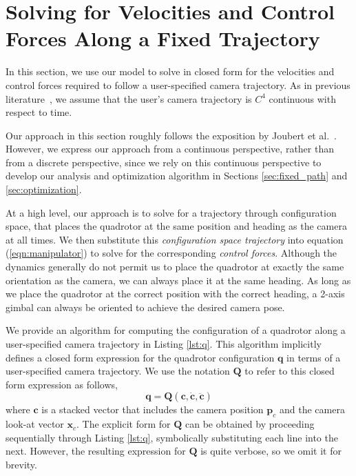 \section{Solving for Velocities and Control Forces Along a Fixed Trajectory}
\label{sec:fixed_trajectory}

In this section, we use our model to solve in closed form for the velocities and control forces required to follow a user-specified camera trajectory.
As in previous literature~\cite{joubert:2015}, we assume that the user's camera trajectory is $C^4$ continuous with respect to time.

Our approach in this section roughly follows the exposition by Joubert et al.~.
However, we express our approach from a continuous perspective, rather than from a discrete perspective, since we rely on this continuous perspective to develop our analysis and optimization algorithm in Sections \ref{sec:fixed_path} and \ref{sec:optimization}.

At a high level, our approach is to solve for a trajectory through configuration space, that places the quadrotor at the same position and heading as the camera at all times.
We then substitute this \emph{configuration space trajectory} into equation (\ref{eqn:manipulator}) to solve for the corresponding \emph{control forces}.
Although the dynamics generally do not permit us to place the quadrotor at exactly the same orientation as the camera, we can always place it at the same heading.
As long as we place the quadrotor at the correct position with the correct heading, a 2-axis gimbal can always be oriented to achieve the desired camera pose.

We provide an algorithm for computing the configuration of a quadrotor along a user-specified camera trajectory in Listing \ref{lst:q}.
This algorithm implicitly defines a closed form expression  for the quadrotor configuration $\mathbf{q}$ in terms of a user-specified camera trajectory.
We use the notation $\mathbf{Q}$ to refer to this closed form expression as follows,
%
\begin{equation}
\mathbf{q} = \mathbf{Q} (\mathbf{c},\dot{\mathbf{c}},\ddot{\mathbf{c}})
\label{eqn:q}
\end{equation}
%
where $\mathbf{c}$ is a stacked vector that includes the camera position $\mathbf{p}_c$ and the camera look-at vector $\mathbf{x}_c$.
The explicit form for $\mathbf{Q}$ can be obtained by proceeding sequentially through Listing \ref{lst:q}, symbolically substituting each line into the next.
However, the resulting expression for $\mathbf{Q}$ is quite verbose, so we omit it for brevity.

